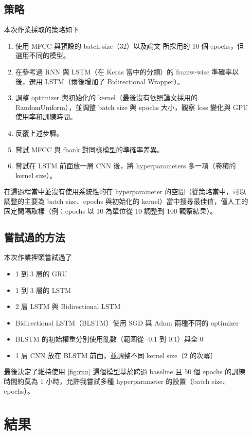 \documentclass[final,3p]{elsarticle}
\begin{document}
	\subsection{策略}
		本次作業採取的策略如下
		\begin{enumerate}
			\item 使用 MFCC 與預設的 batch size（32）以及論文 \cite{Graves_2005} 所採用的 10 個 epochs，但選用不同的模型。
			\item 在參考過 RNN 與 LSTM（在 Keras 當中的分類）的 framw-wise 準確率以後，選用 LSTM（爾後增加了 Bidirectional Wrapper）。
			\item 調整 optimizer 與初始化的 kernel（最後沒有依照論文採用的 RandomUniform），並調整 batch size 與 epochs 大小，觀察 loss 變化與 GPU 使用率和訓練時間。
			\item 反覆上述步驟。
			\item 嘗試 MFCC 與 fbank 對同樣模型的準確率差異。
			\item 嘗試在 LSTM 前面放一層 CNN 後，將 hyperparameters 多一項（卷積的 kernel size）。
		\end{enumerate}
		
		在這過程當中並沒有使用系統性的在 hyperparameter 的空間（從策略當中，可以調整的主要為 batch size、epochs 與初始化的 kernel）當中搜尋最佳值，僅人工的固定間隔取樣（例：epochs 以 10 為單位從 10 調整到 100 觀察結果）。
	
	\subsection{嘗試過的方法}
		本次作業裡頭嘗試過了
		\begin{itemize}
			\item 1 到 3 層的 GRU
			\item 1 到 3 層的 LSTM
			\item 2 層 LSTM 與 Bidirectional LSTM
			\item Bidirectional LSTM（BLSTM）使用 SGD 與 Adam 兩種不同的 optimizer
			\item BLSTM 的初始權重分別使用亂數（範圍從 -0.1 到 0.1）與全 0
			\item 1 層 CNN 放在 BLSTM 前面，並調整不同 kernel size（2 的次冪）
		\end{itemize}	
		
		最後決定了維持使用 \cref{fig:rnn} 這個模型基於跨過 baseline 且 50 個 epochs 的訓練時間約莫為 1 小時，允許我嘗試多種 hyperparameter 的設置（batch size、epochs）。
		
\section{結果}
\end{document}

